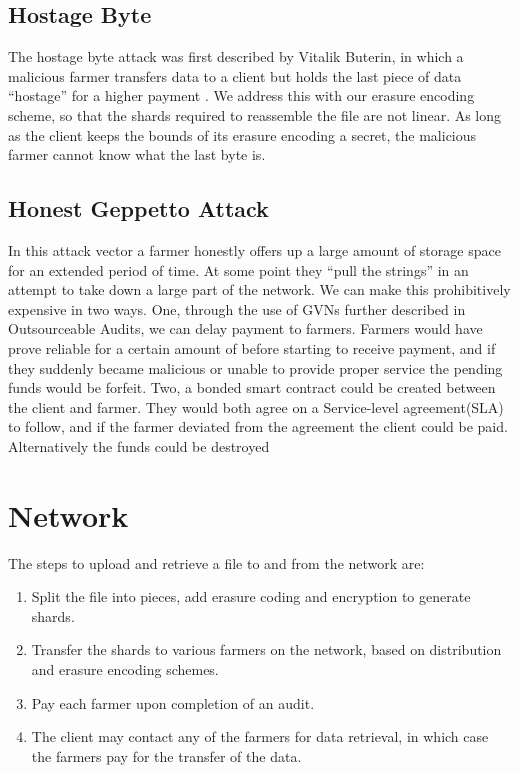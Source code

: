 \documentclass[a4paper,10pt]{article}
\begin{document}
\subsection{Hostage Byte}
The hostage byte attack was first described by Vitalik Buterin, in which a malicious farmer transfers data to a client but holds the last piece of data “hostage” for a higher payment \cite{16}. We address this with our erasure encoding scheme, so that the shards required to reassemble the file are not linear. As long as the client keeps the bounds of its erasure encoding a secret, the malicious farmer cannot know what the last byte is.

\subsection{Honest Geppetto Attack}
In this attack vector a farmer honestly offers up a large amount of storage space for an extended period of time. At some point they “pull the strings” in an attempt to take down a large part of the network. We can make this prohibitively expensive in two ways. One, through the use of GVNs further described in Outsourceable Audits, we can delay payment to farmers. Farmers would have prove reliable for a certain amount of before starting to receive payment, and if they suddenly became malicious or unable to provide proper service the pending funds would be forfeit. Two, a bonded smart contract could be created between the client and farmer. They would both agree on a Service-level agreement(SLA) to follow, and if the farmer deviated from the agreement the client could be paid. Alternatively the funds could be destroyed

\section{Network}
The steps to upload and retrieve a file to and from the network are:
\begin{enumerate}
\item Split the file into pieces, add erasure coding and encryption to generate shards.
\item Transfer the shards to various farmers on the network, based on distribution and erasure encoding schemes.
\item Pay each farmer upon completion of an audit.
\item The client may contact any of the farmers for data retrieval, in which case the farmers pay for the transfer of the data.
\end{enumerate}
\end{document}
